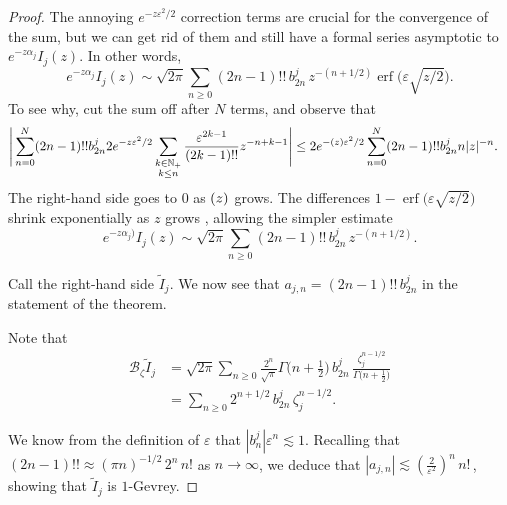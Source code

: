 \documentclass{article}
\let\Re\relax
\DeclareMathOperator{\Re}{Re}
\theoremstyle{definition}
\newcommand{\borel}{\mathcal{B}}
\theoremstyle{plain}
\begin{document}
\begin{proof}
The annoying $e^{-z\varepsilon^2/2}$ correction terms are crucial for the convergence of the sum, but we can get rid of them and still have a formal series asymptotic to $e^{-z \alpha_j} I_j(z)$. In other words,
\[ e^{-z \alpha_j} I_j(z) \sim \sqrt{2\pi} \sum_{n \ge 0} (2n-1)!!\,b_{2n}^j\,z^{-(n+1/2)} \operatorname{erf}\big(\varepsilon \sqrt{z/2}\big). \]
To see why, cut the sum off after $N$ terms, and observe that
\begin{align*}
  \Bigg | \sum_{n= 0}^N(2n-1)!! b_{2n}^j  2e^{-z\varepsilon^2/2} \sum_{\substack{k \in \mathbb{N}_+ \\ k \le n}} \frac{\varepsilon^{2k-1}}{(2k-1)!!} z^{-n+k-1} \Bigg | &\leq  2 e^{-\Re (z) \varepsilon^2/2} \sum_{n=0}^N(2n-1)!! b_{2n}^j n|z|^{-n}.
\end{align*}
The right-hand side goes to $0$ as $\Re(z)$ grows.
The differences $1 - \operatorname{erf}\big(\varepsilon \sqrt{z/2}\big)$ shrink exponentially as $z$ grows \cite[inequality~(5)]{chiani-dardari-book}, allowing the simpler estimate
\[ e^{-z\alpha_j)} I_j(z) \sim \sqrt{2\pi} \sum_{n \ge 0} (2n-1)!!\, b_{2n}^j \,z^{-(n+1/2)}. \] 

Call the right-hand side $\tilde{I}_j$. We now see that $a_{j,n} = (2n-1)!!\,b_{2n}^j$ in the statement of the theorem. %

Note that 
\begin{align*}
\borel_{\zeta} \tilde{I}_j & = \sqrt{2\pi} \sum_{n \ge 0} \frac{2^n}{\sqrt{\pi}} \Gamma\big(n+\tfrac{1}{2}\big)\,b_{2n}^j\,\frac{\zeta_j^{n-1/2}}{\Gamma\big(n+\tfrac{1}{2}\big)} \\
& = \sum_{n \ge 0} 2^{n+1/2}\,b_{2n}^j \,\zeta_j^{n-1/2}.
\end{align*}

We know from the definition of $\varepsilon$ that $\left|b_n^j\right| \varepsilon^n \lesssim 1$. Recalling that $(2n - 1)!! \approx (\pi n)^{-1/2}\,2^n\,n!$ as $n \to \infty$, we deduce that $|a_{j,n}| \lesssim \left(\tfrac{2}{\varepsilon^2}\right)^n\,n!\,$, showing that $\tilde{I}_j$ is $1$-Gevrey.


\end{proof}
\end{document}
